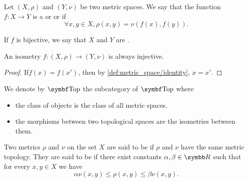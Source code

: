 \begin{definition}\label{def:isometry}\cite[253]{Engelking1989}
  Let \( (X, \rho) \) and \( (Y, \nu) \) be two metric spaces. We say that the function \( f: X \to Y \) is a  or  or  if
  \begin{equation*}
    \forall x, y \in X, \rho(x, y) = \nu(f(x), f(y)).
  \end{equation*}

  If \( f \) is bijective, we say that \( X \) and \( Y \) are .
\end{definition}

\begin{proposition}\label{def:isometry_is_injective}
  An isometry \( f: (X, \rho) \to (Y, \nu) \) is always injective.
\end{proposition}
\begin{proof}
  If\LEM \( f(x) = f(x') \), then by \ref{def:metric_space/identity}, \( x = x' \).
\end{proof}

\begin{definition}\label{def:category_of_metric_spaces}
  We denote by \( \Cat{Top} \) the subcategory of \( \Bold{Top} \) where
  \begin{itemize}
    \item the class of objects is the class of all metric spaces.
    \item the morphisms between two topological spaces are the isometries between them.
  \end{itemize}
\end{definition}

\begin{definition}\label{def:equivalent_metrics}
  Two metrics \( \rho \) and \( \nu \) on the set \( X \) are said to be  if \( \rho \) and \( \nu \) have the same metric topology. They are said to be  if there exist constants \( \alpha, \beta \in \R \) such that for every \( x, y \in X \) we have
  \begin{equation*}
    \alpha \nu(x, y) \leq \rho(x, y) \leq \beta \nu(x, y).
  \end{equation*}
\end{definition}


